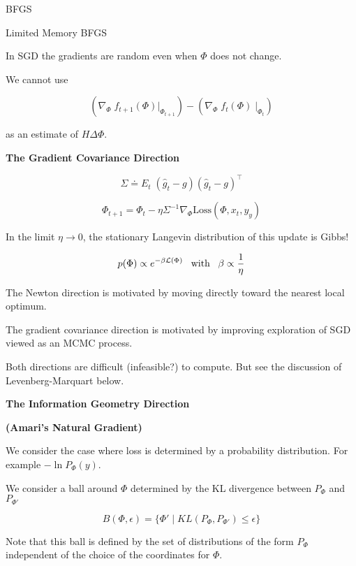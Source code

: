 {\vfill
BFGS

\vfill
Limited Memory BFGS


In SGD the gradients are random even when $\Phi$ does not change.

\vfill
We cannot use

\vfill
$$\left(\nabla_\Phi \;f_{t+1}(\Phi)|_{\Phi_{t+1}}\right) - \left(\nabla_\Phi \;f_t(\Phi)\;|_{\Phi_t}\right)$$

\vfill
as an estimate of $H \Delta \Phi$.

\slide{}

\centerline{\bf The Gradient Covariance Direction}

\vfill


$$\Sigma \doteq E_t \;(\hat{g}_t - g)(\hat{g}_t - g)^\top$$

$$\Phi_{t+1} = \Phi_t - \eta \Sigma^{-1} \nabla_\Phi \mathrm{Loss}(\Phi,x_t,y_y)$$

\vfill
In the limit $\eta \rightarrow 0$, the stationary Langevin distribution of this update is Gibbs!

$$p(\Phi) \propto e^{-\beta {\cal L}(\Phi)}\;\;\;\mbox{with}\;\;\;\beta \propto \frac{1}{\eta}$$


The Newton direction is motivated by moving directly toward the nearest local optimum.

\vfill
The gradient covariance direction is motivated by improving exploration of SGD viewed as an MCMC process.

\vfill
Both directions are difficult (infeasible?) to compute.  But see the discussion of Levenberg-Marquart below.

\slide{}
\centerline{\bf The Information Geometry Direction}
\centerline{\bf (Amari's Natural Gradient)}
\vfill


We consider the case where loss is determined by a probability distribution.  For example $- \ln P_\Phi(y)$.

\vfill
We consider a ball around $\Phi$ determined by the KL divergence between $P_{\Phi}$ and $P_{\Phi'}$

$$B(\Phi,\epsilon) = \{\Phi' \;|\; KL(P_\Phi,P_{\Phi'}) \leq \epsilon\}$$

\vfill
Note that this ball is defined by the set of distributions of the form $P_\Phi$ independent of the choice of the coordinates for $\Phi$.

}
